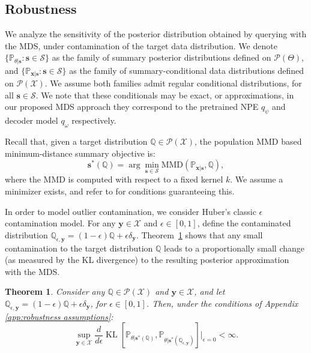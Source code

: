 \documentclass{article}
\theoremstyle{plain}
\newtheorem{theorem}{Theorem}[section]
\theoremstyle{definition}
\theoremstyle{remark}
\DeclareMathOperator{\KL}{KL}
\begin{document}
\subsection{Robustness}

We analyze the sensitivity of the posterior distribution obtained by querying with the MDS, under contamination of the target data distribution. We denote \( \{ \mathbb{P}_{\theta|\mathbf{s}} : \mathbf{s} \in \mathcal{S} \} \) as the family of summary posterior distributions defined on  \( \mathcal{P}(\Theta) \), and \( \{ \mathbb{P}_{\mathbf{x}|\mathbf{s}} : \mathbf{s} \in \mathcal{S} \} \) as the family of summary-conditional data distributions defined on \( \mathcal{P}(\mathcal{X}) \). We assume both families admit regular conditional distributions, for all \( \mathbf{s} \in \mathcal{S} \). We note that these conditionals may be exact, or approximations, in our proposed MDS approach they correspond to the pretrained NPE \( q_\psi \) and decoder model \( q_\omega \) respectively.  

Recall that, given a target distribution \( \mathbb{Q} \in \mathcal{P}(\mathcal{X}) \), the population MMD based minimum-distance summary objective is:
\[
\mathbf{s}^*(\mathbb{Q}) = \arg\min_{\mathbf{s} \in \mathcal{S}}
\mathrm{MMD}(\mathbb{P}_{\mathbf{x} | \mathbf{s}}, \mathbb{Q}),
\]
where the MMD is computed with respect to a fixed kernel \( k \). We assume a minimizer exists, and refer to \citet{briolStatisticalInferenceGenerative2019b} for conditions guaranteeing this.

In order to model outlier contamination, we consider Huber's classic \( \epsilon \) contamination model.
For any \( \mathbf{y} \in \mathcal{X} \) and \( \epsilon \in [0,1] \), define the contaminated distribution $\mathbb{Q}_{\epsilon, \mathbf{y}} = (1-\epsilon) \mathbb{Q} + \epsilon \delta_\mathbf{y}$.
Theorem~\ref{thm:robustness} shows that any small contamination to the target distribution \( \mathbb{Q} \) leads to a proportionally small change (as measured by the KL divergence) to the resulting posterior approximation with the MDS.

\begin{theorem} \label{thm:robustness}
Consider any $\mathbb{Q} \in \mathcal{P}(\mathcal{X})$ and $\mathbf{y} \in \mathcal{X}$, and let $\mathbb{Q}_{\epsilon, \mathbf{y}} = (1-\epsilon) \mathbb{Q} + \epsilon \delta_\mathbf{y}$, for $\epsilon \in [0,1]$.
Then, under the conditions of Appendix \ref{app:robustness assumptions}:
\begin{equation} \label{eq:robustness}
\sup_{\mathbf{y} \in \mathcal{X}} \frac{d}{d\epsilon} \KL[
\mathbb{P}_{\theta|\mathbf{s}^*(\mathbb{Q})},
\mathbb{P}_{\theta|\mathbf{s}^*(\mathbb{Q}_{\epsilon, \mathbf{y}})}
] \Big|_{\epsilon=0} < \infty.
\end{equation}
\end{theorem}
\end{document}
